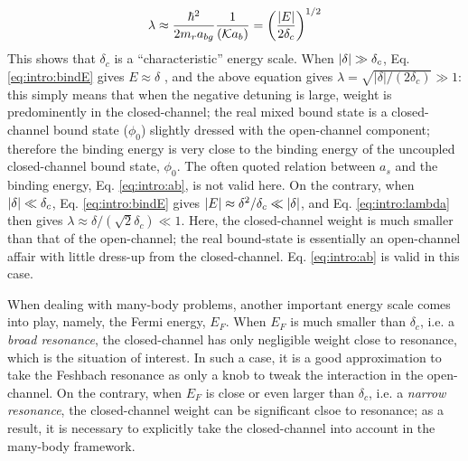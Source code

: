 \begin{equation}\label{eq:intro:lambda}
\lambda\approx\frac{\hbar^{2}}{2m_{r}a_{bg}}\frac{1}{(\mathcal{K}a_{b})}=\left(\frac{\left\lvert{E}\right\rvert}{2\delta_{c}}\right)^{1/2}
\end{equation}
This shows that  $\delta_{c}$ is a ``characteristic'' energy scale. When $\left\lvert{\delta}\right\rvert\gg\delta_{c}$, Eq. \ref{eq:intro:bindE} gives $E\approx\delta$ , and the above equation gives $\lambda=\sqrt{|\delta|/(2\delta_{c})}\gg1$: this simply means that when the negative detuning is large, weight is predominently in the closed-channel; the real mixed bound state is a closed-channel bound state ($\phi_{0}$) slightly dressed with the open-channel component; therefore the binding energy is very close to the binding energy  of the uncoupled closed-channel bound state, $\phi_{0}$.  The often quoted relation between $a_{s}$ and the binding energy, Eq. \ref{eq:intro:ab},  is not valid here.  On the contrary, when $\left\lvert{\delta}\right\rvert\ll\delta_{c}$, Eq. \ref{eq:intro:bindE}  gives $\left\lvert{E}\right\rvert\approx\delta^{2}/\delta_{c}\ll\left\lvert{\delta}\right\rvert$,  and Eq. \ref{eq:intro:lambda} then gives $\lambda\approx{\delta/(\sqrt{2}\delta_{c})}\ll1$.  Here, the closed-channel weight is much smaller than that of the open-channel; the real bound-state is essentially an open-channel affair with little dress-up from the closed-channel.  Eq. \ref{eq:intro:ab} is valid in this case. %

When dealing with  many-body problems, another important energy scale comes into play, namely, the Fermi energy, $E_{F}$.  When $E_{F}$ is much smaller than $\delta_{c}$, i.e. a \emph{broad resonance},  the closed-channel has only negligible weight close to resonance, which is the situation of interest. In such a case, it is a good approximation to take the Feshbach resonance as only a knob to tweak the interaction in the open-channel.  On the contrary, when $E_{F}$ is close or even larger than $\delta_{c}$, i.e. a \emph{narrow resonance}, the closed-channel weight can be  significant clsoe to  resonance; as a result, it is necessary to explicitly take the closed-channel into account in the many-body framework.  










